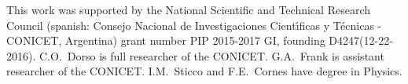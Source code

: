 \begin{acknowledgments}
This work was supported by the National Scientific and Technical 
Research Council (spanish: Consejo Nacional de Investigaciones Cient\'\i ficas 
y T\'ecnicas - CONICET, Argentina) grant number PIP 2015-2017 GI, founding 
D4247(12-22-2016). C.O.~Dorso is full researcher of the CONICET. G.A.~Frank is 
 assistant researcher of the CONICET. I.M.~Sticco and F.E.~Cornes 
have degree in Physics.
\end{acknowledgments}
